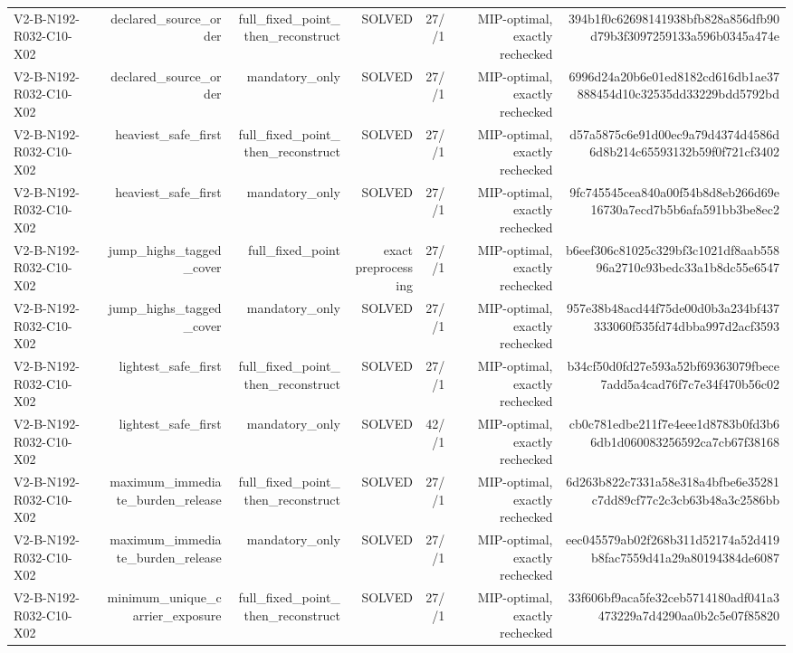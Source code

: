 {\begin{longtable}{lrrrrrr}
V2-B-N192-R032-C10-X02 & declared\_source\_order & full\_fixed\_point\_then\_reconstruct & SOLVED & 27//1 & MIP-optimal, exactly rechecked & 394b1f0c62698141938bfb828a856dfb90d79b3f3097259133a596b0345a474e \\
V2-B-N192-R032-C10-X02 & declared\_source\_order & mandatory\_only & SOLVED & 27//1 & MIP-optimal, exactly rechecked & 6996d24a20b6e01ed8182cd616db1ae37888454d10c32535dd33229bdd5792bd \\
V2-B-N192-R032-C10-X02 & heaviest\_safe\_first & full\_fixed\_point\_then\_reconstruct & SOLVED & 27//1 & MIP-optimal, exactly rechecked & d57a5875c6e91d00ec9a79d4374d4586d6d8b214c65593132b59f0f721cf3402 \\
V2-B-N192-R032-C10-X02 & heaviest\_safe\_first & mandatory\_only & SOLVED & 27//1 & MIP-optimal, exactly rechecked & 9fc745545cea840a00f54b8d8eb266d69e16730a7ecd7b5b6afa591bb3be8ec2 \\
V2-B-N192-R032-C10-X02 & jump\_highs\_tagged\_cover & full\_fixed\_point & exact preprocessing & 27//1 & MIP-optimal, exactly rechecked & b6eef306c81025c329bf3c1021df8aab55896a2710c93bedc33a1b8dc55e6547 \\
V2-B-N192-R032-C10-X02 & jump\_highs\_tagged\_cover & mandatory\_only & SOLVED & 27//1 & MIP-optimal, exactly rechecked & 957e38b48acd44f75de00d0b3a234bf437333060f535fd74dbba997d2acf3593 \\
V2-B-N192-R032-C10-X02 & lightest\_safe\_first & full\_fixed\_point\_then\_reconstruct & SOLVED & 27//1 & MIP-optimal, exactly rechecked & b34cf50d0fd27e593a52bf69363079fbece7add5a4cad76f7c7e34f470b56c02 \\
V2-B-N192-R032-C10-X02 & lightest\_safe\_first & mandatory\_only & SOLVED & 42//1 & MIP-optimal, exactly rechecked & cb0c781edbe211f7e4eee1d8783b0fd3b66db1d060083256592ca7cb67f38168 \\
V2-B-N192-R032-C10-X02 & maximum\_immediate\_burden\_release & full\_fixed\_point\_then\_reconstruct & SOLVED & 27//1 & MIP-optimal, exactly rechecked & 6d263b822c7331a58e318a4bfbe6e35281c7dd89cf77c2c3cb63b48a3c2586bb \\
V2-B-N192-R032-C10-X02 & maximum\_immediate\_burden\_release & mandatory\_only & SOLVED & 27//1 & MIP-optimal, exactly rechecked & eec045579ab02f268b311d52174a52d419b8fac7559d41a29a80194384de6087 \\
V2-B-N192-R032-C10-X02 & minimum\_unique\_carrier\_exposure & full\_fixed\_point\_then\_reconstruct & SOLVED & 27//1 & MIP-optimal, exactly rechecked & 33f606bf9aca5fe32ceb5714180adf041a3473229a7d4290aa0b2c5e07f85820 \\

\end{longtable}}
